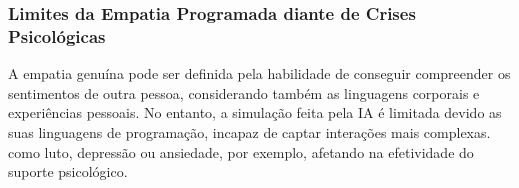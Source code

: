 \documentclass[12pt]{article}
\begin{document}


\subsubsection{Limites da Empatia Programada diante de Crises Psicológicas}

A empatia genuína pode ser definida pela habilidade de conseguir compreender os sentimentos de outra pessoa, considerando também as linguagens corporais e experiências pessoais. No entanto, a simulação feita pela IA é limitada devido as suas linguagens de programação, incapaz de captar interações mais complexas. como luto, depressão ou ansiedade, por exemplo, afetando na efetividade do suporte psicológico. \cite{alex2024}
\end{document}
